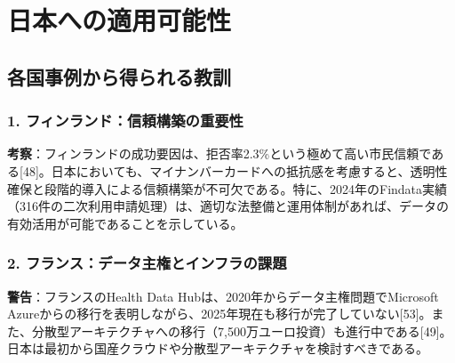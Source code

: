 \documentclass[
  a4paper,
  a4paper,
  11pt]{ltjsbook}
\begin{document}
\section{日本への適用可能性}\label{ux65e5ux672cux3078ux306eux9069ux7528ux53efux80fdux6027}

\subsection{各国事例から得られる教訓}\label{ux5404ux56fdux4e8bux4f8bux304bux3089ux5f97ux3089ux308cux308bux6559ux8a13}

\subsubsection{1.
フィンランド：信頼構築の重要性}\label{ux30d5ux30a3ux30f3ux30e9ux30f3ux30c9ux4fe1ux983cux69cbux7bc9ux306eux91cdux8981ux6027}

\textbf{考察}：フィンランドの成功要因は、拒否率2.3\%という極めて高い市民信頼である{[}48{]}。日本においても、マイナンバーカードへの抵抗感を考慮すると、透明性確保と段階的導入による信頼構築が不可欠である。特に、2024年のFindata実績（316件の二次利用申請処理）は、適切な法整備と運用体制があれば、データの有効活用が可能であることを示している。

\subsubsection{2.
フランス：データ主権とインフラの課題}\label{ux30d5ux30e9ux30f3ux30b9ux30c7ux30fcux30bfux4e3bux6a29ux3068ux30a4ux30f3ux30d5ux30e9ux306eux8ab2ux984c}

\begin{tcolorbox}[enhanced jigsaw, toprule=.15mm, bottomtitle=1mm, coltitle=black, left=2mm, opacityback=0, arc=.35mm, colbacktitle=quarto-callout-warning-color!10!white, colback=white, opacitybacktitle=0.6, bottomrule=.15mm, rightrule=.15mm, breakable, title=\textcolor{quarto-callout-warning-color}{\faExclamationTriangle}\hspace{0.5em}{Warning}, toptitle=1mm, titlerule=0mm, colframe=quarto-callout-warning-color-frame, leftrule=.75mm]

\textbf{警告}：フランスのHealth Data
Hubは、2020年からデータ主権問題でMicrosoft
Azureからの移行を表明しながら、2025年現在も移行が完了していない{[}53{]}。また、分散型アーキテクチャへの移行（7,500万ユーロ投資）も進行中である{[}49{]}。日本は最初から国産クラウドや分散型アーキテクチャを検討すべきである。

\end{tcolorbox}
\end{document}
